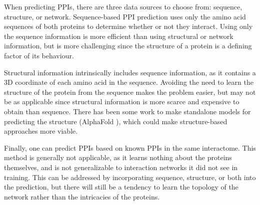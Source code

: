 \documentclass{article}
\begin{document}
When predicting PPIs, there are three data sources to choose from: sequence, structure, or network. Sequence-based PPI prediction uses only the amino acid sequences of both proteins to determine whether or not they interact. Using only the sequence information is more efficient than using structural or network information, but is more challenging since the structure of a protein is a defining factor of its behaviour. 

Structural information intrinsically includes sequence information, as it contains a 3D coordinate of each amino acid in the sequence. Avoiding the need to learn the structure of the protein from the sequence makes the problem easier, but may not be as applicable since structural information is more scarce and expensive to obtain than sequence. There has been some work to make standalone models for predicting the structure (AlphaFold \citep{abramson_accurate_2024}), which could make structure-based approaches more viable.

Finally, one can predict PPIs based on known PPIs in the same interactome. This method is generally not applicable, as it learns nothing about the proteins themselves, and is not generalizable to interaction networks it did not see in training. This can be addressed by incorporating sequence, structure, or both into the prediction, but there will still be a tendency to learn the topology of the network rather than the intricacies of the proteins.
\end{document}
